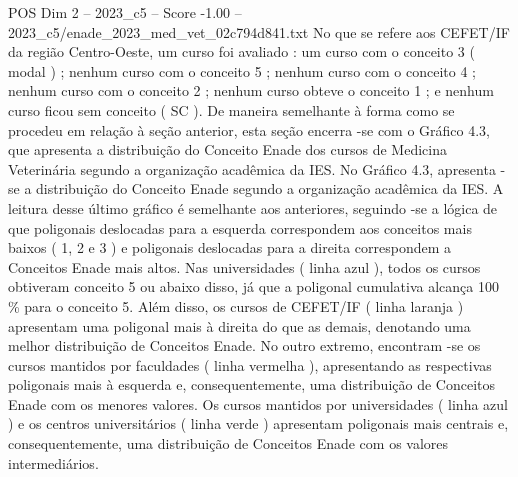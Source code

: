 \begin{textsample}{POS Dim 2 – 2023\_c5 – Score -1.00 – 2023\_c5/enade\_2023\_med\_vet\_02c794d841.txt}
No que se refere aos CEFET/IF da região Centro-Oeste, um curso foi avaliado : um curso com o conceito 3 ( modal ) ; nenhum curso com o conceito 5 ; nenhum curso com o conceito 4 ; nenhum curso com o conceito 2 ; nenhum curso obteve o conceito 1 ; e nenhum curso ficou sem conceito ( SC ).
De maneira semelhante à forma como se procedeu em relação à seção anterior, esta seção encerra -se com o Gráfico 4.3, que apresenta a distribuição do Conceito Enade dos cursos de Medicina Veterinária segundo a organização acadêmica da IES.
No Gráfico 4.3, apresenta -se a distribuição do Conceito Enade segundo a organização acadêmica da IES.
A leitura desse último gráfico é semelhante aos anteriores, seguindo -se a lógica de que poligonais deslocadas para a esquerda correspondem aos conceitos mais baixos ( 1, 2 e 3 ) e poligonais deslocadas para a direita correspondem a Conceitos Enade mais altos.
Nas universidades ( linha azul ), todos os cursos obtiveram conceito 5 ou abaixo disso, já que a poligonal cumulativa alcança 100 \% para o conceito 5.
Além disso, os cursos de CEFET/IF ( linha laranja ) apresentam uma poligonal mais à direita do que as demais, denotando uma melhor distribuição de Conceitos Enade.
No outro extremo, encontram -se os cursos mantidos por faculdades ( linha vermelha ), apresentando as respectivas poligonais mais à esquerda e, consequentemente, uma distribuição de Conceitos Enade com os menores valores.
Os cursos mantidos por universidades ( linha azul ) e os centros universitários ( linha verde ) apresentam poligonais mais centrais e, consequentemente, uma distribuição de Conceitos Enade com os valores intermediários.

\end{textsample}

